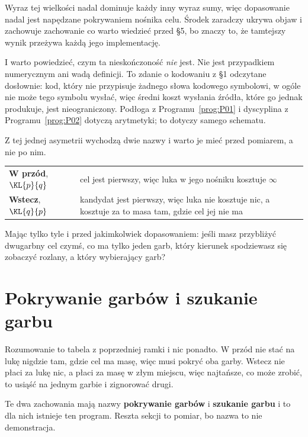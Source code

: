 \begin{fr}

Wyraz tej wielkości nadal dominuje każdy inny wyraz sumy, więc dopasowanie
nadal jest napędzane pokrywaniem nośnika celu. Środek zaradczy ukrywa objaw
i zachowuje zachowanie \dash{} co warto wiedzieć przed §5, bo znaczy to, że
tamtejszy wynik przeżywa każdą jego implementację.

I warto powiedzieć, czym ta nieskończoność \emph{nie} jest. Nie jest
przypadkiem numerycznym ani wadą definicji. To zdanie o kodowaniu z §1
odczytane dosłownie: kod, który nie przypisuje żadnego słowa kodowego
symbolowi, w ogóle nie może tego symbolu wysłać, więc średni koszt wysłania
źródła, które go jednak produkuje, jest nieograniczony. Podłoga z
Programu~\ref{prog:P01} i dyscyplina z Programu~\ref{prog:P02} dotyczą
arytmetyki; to dotyczy samego schematu.
\end{fr}

\begin{fr}
Z tej jednej asymetrii wychodzą dwie nazwy i warto je mieć przed pomiarem, a
nie po nim.

\begin{center}
\begin{tabularx}{\linewidth}{@{}lX@{}}
\toprule
\textbf{W przód}, $\KL{p}{q}$ & cel jest pierwszy, więc luka w jego nośniku
kosztuje $\infty$ \\
\textbf{Wstecz}, $\KL{q}{p}$ & kandydat jest pierwszy, więc luka nie
kosztuje nic, a kosztuje za to masa tam, gdzie cel jej nie ma \\
\bottomrule
\end{tabularx}
\end{center}

Mając tylko tyle i przed jakimkolwiek dopasowaniem: jeśli masz przybliżyć
dwugarbny cel czymś, co ma tylko jeden garb, który kierunek spodziewasz się
zobaczyć rozlany, a który wybierający garb?
\dotline
\nextframe
\end{fr}

\section{Pokrywanie garbów i szukanie garbu}
\label{sec:P30-modes}

\begin{fr}

Rozumowanie to tabela z poprzedniej ramki i nic ponadto. W przód nie stać na
lukę nigdzie tam, gdzie cel ma masę, więc musi pokryć oba garby. Wstecz nie
płaci za lukę nic, a płaci za masę w złym miejscu, więc najtańsze, co może
zrobić, to usiąść na jednym garbie i zignorować drugi.

Te dwa zachowania mają nazwy \dash{} \textbf{pokrywanie garbów} i
\textbf{szukanie garbu} \dash{} i to dla nich istnieje ten program. Reszta
sekcji to pomiar, bo nazwa to nie demonstracja.
\end{fr}

